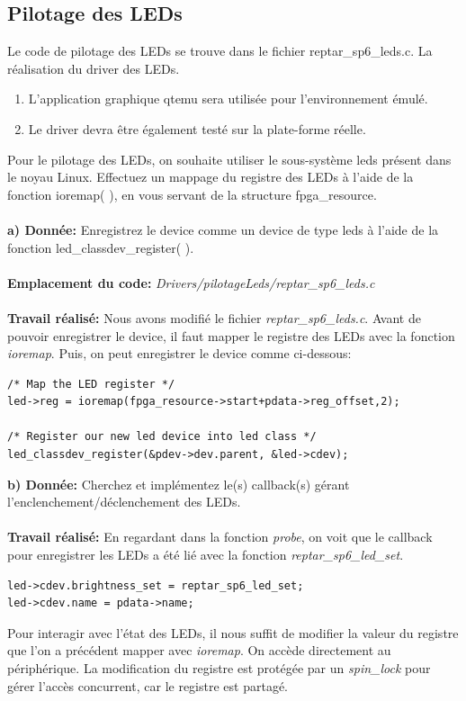 \subsection{Pilotage des LEDs }
Le code de pilotage des LEDs se trouve dans le fichier reptar\_sp6\_leds.c. La réalisation du driver des
LEDs.
\begin{enumerate}
	\item L’application graphique qtemu sera utilisée pour l'environnement émulé.
	\item Le driver devra être également testé sur la plate-forme réelle.
\end{enumerate}
Pour le pilotage des LEDs, on souhaite utiliser le sous-système leds présent dans le noyau Linux.
Effectuez un mappage du registre des LEDs à l'aide de la fonction ioremap( ), en vous servant de la
structure fpga\_resource.\\\\
\textbf{a) Donnée: }Enregistrez le device comme un device de type leds à l'aide de la fonction led\_classdev\_register( ).\\\\
\textbf{Emplacement du code: }\textit{Drivers/pilotageLeds/reptar\_sp6\_leds.c}\\\\
\textbf{Travail réalisé: }Nous avons modifié le fichier \textit{reptar\_sp6\_leds.c}. Avant de pouvoir enregistrer le device, il faut mapper le registre des LEDs avec la fonction \textit{ioremap}. Puis, on peut enregistrer le device comme ci-dessous:
\begin{lstlisting}
/* Map the LED register */
led->reg = ioremap(fpga_resource->start+pdata->reg_offset,2);

/* Register our new led device into led class */
led_classdev_register(&pdev->dev.parent, &led->cdev);
\end{lstlisting}
\textbf{b) Donnée: }Cherchez et implémentez le(s) callback(s) gérant l'enclenchement/déclenchement des LEDs.\\\\
\textbf{Travail réalisé: }En regardant dans la fonction \textit{probe}, on voit que le callback pour enregistrer les LEDs a été lié avec la fonction \textit{reptar\_sp6\_led\_set}.
\begin{lstlisting}
led->cdev.brightness_set = reptar_sp6_led_set;
led->cdev.name = pdata->name;
\end{lstlisting}
Pour interagir avec l'état des LEDs, il nous suffit de modifier la valeur du registre que l'on a précédent mapper avec \textit{ioremap}. On accède directement au périphérique. La modification du registre est protégée par un \textit{spin\_lock} pour gérer l'accès concurrent, car le registre est partagé.

